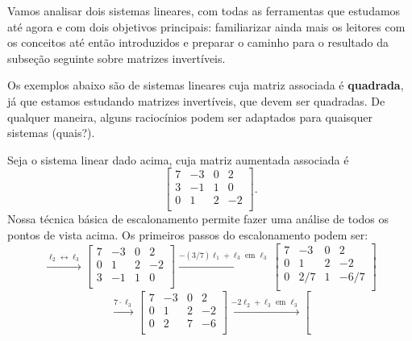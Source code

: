 Vamos analisar dois sistemas lineares, com todas as ferramentas que estudamos até agora e com dois objetivos principais: familiarizar ainda mais os leitores com os conceitos até então introduzidos e preparar o caminho para o resultado da subseção seguinte sobre matrizes invertíveis.

Os exemplos abaixo são de sistemas lineares cuja matriz associada é \textbf{quadrada}, já que estamos estudando matrizes invertíveis, que devem ser quadradas. De qualquer maneira, alguns raciocínios podem ser adaptados para quaisquer sistemas (quais?).

\begin{ex}
	Seja o sistema linear dado acima, cuja matriz aumentada associada é
	\begin{equation}
	\left[
	\begin{array}{ccc|c}
	7 & -3 & 0 & 2 \\
	3 & -1 & 1 & 0 \\
	0 & 1 & 2 & -2 \\
	\end{array}
	\right].
	\end{equation} Nossa técnica básica de escalonamento permite fazer uma análise de todos os pontos de vista acima. Os primeiros passos do escalonamento podem ser:
	\begin{equation}
	\xrightarrow{\ell_2 \leftrightarrow \ell_3}
	\left[
	\begin{array}{ccc|c}
	7 & -3 & 0 & 2 \\
	0 & 1 & 2 & -2 \\
	3 & -1 & 1 & 0 \\
	\end{array}
	\right]\xrightarrow{-(3/7)\ell_1 + \ell_3 \text{ em } \ell_3}
	\left[
	\begin{array}{ccc|c}
	7 & -3 & 0 & 2 \\
	0 & 1 & 2 & -2 \\
	0 & 2/7 & 1 & -6/7 \\
	\end{array}
	\right]
	\end{equation}
	\begin{equation}
	\xrightarrow{7 \cdot \ell_3}
	\left[
	\begin{array}{ccc|c}
	7 & -3 & 0 & 2 \\
	0 & 1 & 2 & -2 \\
	0 & 2 & 7 & -6 \\
	\end{array}
	\right] \xrightarrow{-2\ell_2 + \ell_3 \text{ em } \ell_3}
	\left[

\end{equation}
\end{ex}
